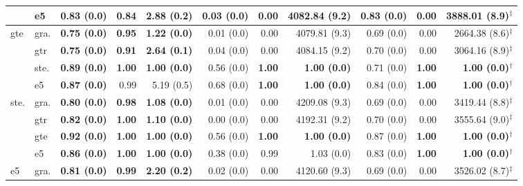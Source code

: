 \begin{table}[!b]
\begin{tabular}{llrrrrrrrrr}
        & e5 & \textbf{0.83 {\tiny (0.0)}} & \textbf{0.84} & \textbf{2.88 {\tiny (0.2)}} & 0.03 {\tiny (0.0)} & 0.00 & 4082.84 {\tiny (9.2)} & \textbf{0.83 {\tiny (0.0)}} & 0.00 & 3888.01 {\tiny (8.9)}$^{\ddagger}$ \\
        \midrule
        \multirow{4}{*}{gte} & gra. & \textbf{0.75 {\tiny (0.0)}} & \textbf{0.95} & \textbf{1.22 {\tiny (0.0)}} & 0.01 {\tiny (0.0)} & 0.00 & 4079.81 {\tiny (9.3)} & 0.69 {\tiny (0.0)} & 0.00 & 2664.38 {\tiny (8.6)}$^{\ddagger}$ \\
        & gtr & \textbf{0.75 {\tiny (0.0)}} & \textbf{0.91} & \textbf{2.64 {\tiny (0.1)}} & 0.04 {\tiny (0.0)} & 0.00 & 4084.15 {\tiny (9.2)} & 0.70 {\tiny (0.0)} & 0.00 & 3064.16 {\tiny (8.9)}$^{\ddagger}$ \\
        & ste. & \textbf{0.89 {\tiny (0.0)}} & \textbf{1.00} & \textbf{1.00 {\tiny (0.0)}} & 0.56 {\tiny (0.0)} & \textbf{1.00} & \textbf{1.00 {\tiny (0.0)}} & 0.71 {\tiny (0.0)} & \textbf{1.00} & \textbf{1.00 {\tiny (0.0)}$^{\dagger}$} \\
        & e5 & \textbf{0.87 {\tiny (0.0)}} & 0.99 & 5.19 {\tiny (0.5)} & 0.68 {\tiny (0.0)} & \textbf{1.00} & \textbf{1.00 {\tiny (0.0)}} & 0.84 {\tiny (0.0)} & \textbf{1.00} & \textbf{1.00 {\tiny (0.0)}$^{\dagger}$} \\
        \midrule
        \multirow{4}{*}{ste.} & gra. & \textbf{0.80 {\tiny (0.0)}} & \textbf{0.98} & \textbf{1.08 {\tiny (0.0)}} & 0.01 {\tiny (0.0)} & 0.00 & 4209.08 {\tiny (9.3)} & 0.69 {\tiny (0.0)} & 0.00 & 3419.44 {\tiny (8.8)}$^{\ddagger}$ \\
        & gtr & \textbf{0.82 {\tiny (0.0)}} & \textbf{1.00} & \textbf{1.10 {\tiny (0.0)}} & 0.00 {\tiny (0.0)} & 0.00 & 4192.31 {\tiny (9.2)} & 0.70 {\tiny (0.0)} & 0.00 & 3555.64 {\tiny (9.0)}$^{\ddagger}$ \\
        & gte & \textbf{0.92 {\tiny (0.0)}} & \textbf{1.00} & \textbf{1.00 {\tiny (0.0)}} & 0.56 {\tiny (0.0)} & \textbf{1.00} & \textbf{1.00 {\tiny (0.0)}} & 0.87 {\tiny (0.0)} & \textbf{1.00} & \textbf{1.00 {\tiny (0.0)}$^{\dagger}$} \\
        & e5 & \textbf{0.86 {\tiny (0.0)}} & \textbf{1.00} & \textbf{1.00 {\tiny (0.0)}} & 0.38 {\tiny (0.0)} & 0.99 & 1.03 {\tiny (0.0)} & 0.83 {\tiny (0.0)} & \textbf{1.00} & \textbf{1.00 {\tiny (0.0)}$^{\dagger}$} \\
        \midrule
        \multirow{4}{*}{e5} & gra. & \textbf{0.81 {\tiny (0.0)}} & \textbf{0.99} & \textbf{2.20 {\tiny (0.2)}} & 0.02 {\tiny (0.0)} & 0.00 & 4120.60 {\tiny (9.3)} & 0.69 {\tiny (0.0)} & 0.00 & 3526.02 {\tiny (8.7)}$^{\ddagger}$ \\

\end{tabular}
\end{table}
